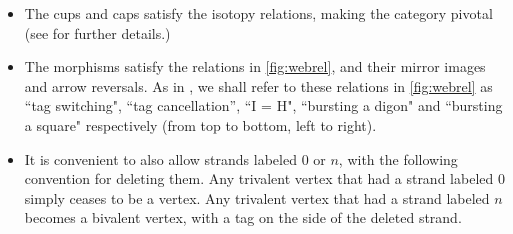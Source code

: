 \begin{definition}
\begin{itemize}
        \item The cups and caps satisfy the isotopy relations, making the category pivotal (see \cite[Chapter 2]{Morr07} for further details.)
        \item  The morphisms satisfy the relations in \cref{fig:webrel}, and their mirror images and arrow reversals.
        As in \cite{Bigelow}, we shall refer to these relations in \cref{fig:webrel} as ``tag switching", ``tag cancellation”, ``I = H", ``bursting a digon" and ``bursting a square" respectively (from top to bottom, left to right).
        \item It is convenient to also allow strands labeled $0$ or $n$, with the following convention for deleting them. Any trivalent vertex that had a strand labeled $0$ simply ceases to be a vertex. Any trivalent vertex that had a strand labeled $n$ becomes a bivalent vertex, with a tag on the side of the deleted strand.
        
    \end{itemize}
\end{definition}
